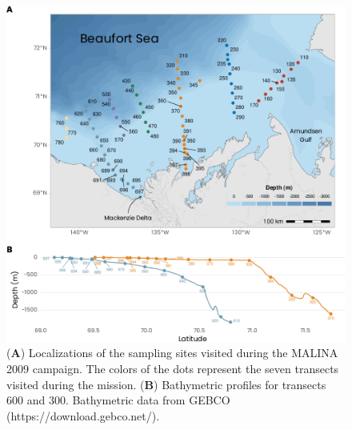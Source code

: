 \documentclass[essd, manuscript]{copernicus}
\begin{document}
\begin{figure}[H]
    \centering
    \includegraphics[scale = 1]{../../../graphs/fig01.pdf}
    \caption{(\textbf{A}) Localizations of the sampling sites visited during the MALINA 2009 campaign. The colors of the dots represent the seven transects visited during the mission. (\textbf{B}) Bathymetric profiles for transects 600 and 300. Bathymetric data from GEBCO (https://download.gebco.net/).}
\end{figure}

\clearpage
\end{document}
